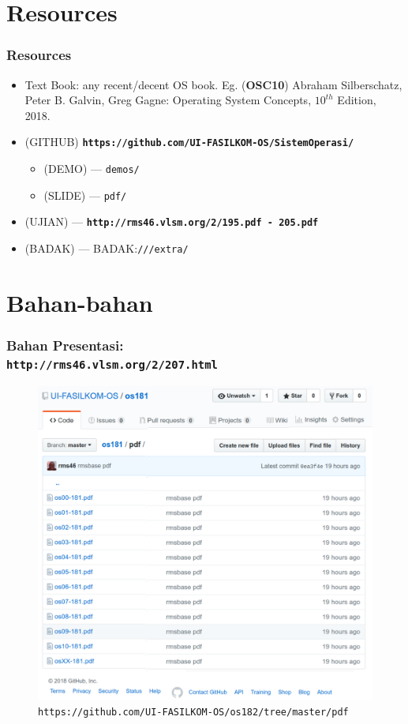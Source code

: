 \documentclass[xcolor=table, notheorems, hyperref={pdfpagelabels=false}]{beamer}
\begin{document}
\section{Resources}
\begin{frame}
\frametitle{Resources}
\begin{itemize}
\item Text Book: any recent/decent OS book. Eg. (\textbf{OSC10}) Abraham Silberschatz, 
Peter B. Galvin, Greg Gagne: Operating System Concepts, $10^{th}$ Edition, 2018.
\item (GITHUB) \texttt{\textbf{https://github.com/UI-FASILKOM-OS/SistemOperasi/}}
\begin{itemize}
\item (DEMO)  --- \texttt{demos/}
\item (SLIDE) --- \texttt{pdf/}
\end{itemize}
\item (UJIAN) --- \texttt{\textbf{http://rms46.vlsm.org/2/195.pdf - 205.pdf}}
\item (BADAK) --- BADAK:\texttt{///extra/}
\end{itemize}
\end{frame}

\section{Bahan-bahan}
\begin{frame}
\frametitle{Bahan Presentasi:\\\texttt{http://rms46.vlsm.org/2/207.html}}
\begin{figure}
\includegraphics[width=0.55\linewidth]{os00-GIT}
\caption{\texttt{https://github.com/UI-FASILKOM-OS/os182/tree/master/pdf}}
\end{figure}
\end{frame}
\end{document}
